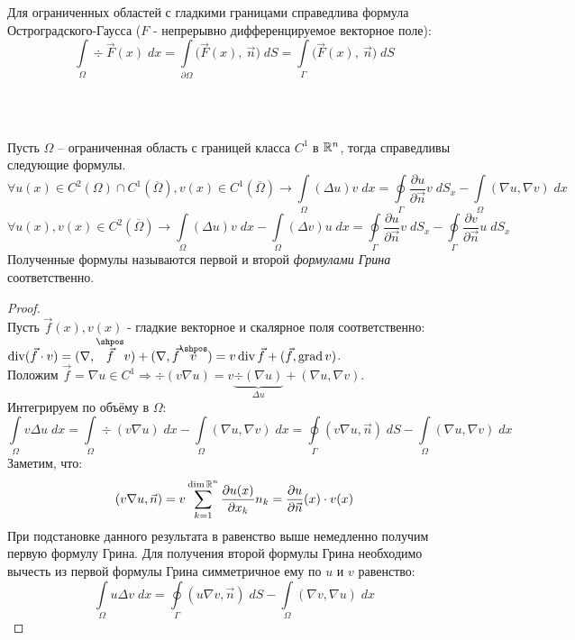 \documentclass[../main.tex]{subfiles}
\begin{document}
\begin{minipage}{0.8\textwidth}
Для ограниченных областей с гладкими границами справедлива формула Остроградского-Гаусса ($F$ - непрерывно дифференцируемое векторное поле):
$$\int\limits_{\Omega} \div \vec{F}(x)\;dx = \int\limits_{\partial \Omega} \bigl(\vec{F}(x),\: \vec{n}\bigr)\;dS = \int\limits_{\Gamma} \bigl(\vec{F}(x),\: \vec{n}\bigr)\;dS$$
\end{minipage} \\
\begin{lemma} \ \\
Пусть $\Omega$ -- ограниченная область с границей класса $C^1$ в $\mathbb{R}^n$, тогда справедливы следующие формулы.
	$$\forall u(x) \in C^2(\Omega)\cap C^1(\overline{\Omega}), v(x) \in C^1(\overline{\Omega}) \to \int\limits_{\Omega} (\Delta u)v\; dx = \oint\limits_{\Gamma} \dfrac{\partial u}{\partial \vec{n}} v\;dS_x - \int\limits_{\Omega}(\nabla u, \nabla v)\;dx $$
$$ \forall u(x), v(x) \in C^2(\overline{\Omega}) \to \int\limits_{\Omega} (\Delta u)v\; dx - \int\limits_{\Omega} (\Delta v)u\; dx = \oint\limits_{\Gamma} \dfrac{\partial u}{\partial \vec{n}} v\;dS_x - \oint\limits_{\Gamma} \dfrac{\partial v}{\partial \vec{n}} u\;dS_x$$
Полученные формулы называются первой и второй\; \textit{формулами Грина} соответственно.
\end{lemma}
\begin{proof}\ \\
Пусть $\vec{f}(x), v(x)$ - гладкие векторное и скалярное поля соответственно: $\div(\vec{f} \cdot v) = (\nabla, \overset{\shpos}{\vec{f}}v) + (\nabla, \vec{f}\overset{\shpos}{v}) = v\div \vec{f} + (\vec{f}, \grad{v})$. \\
Положим $\vec{f} = \nabla u \in C^1 \Rightarrow \div (v \nabla u) = v \underbrace{\div(\nabla u)}_{\Delta u} + (\nabla u, \nabla v)$. \\
Интегрируем по объёму в $\Omega$:
\begin{equation*}
	\int\limits_{\Omega} v \Delta u\;dx = 	\int\limits_{\Omega} \div(v\nabla u)\;dx -\int\limits_{\Omega} (\nabla u, \nabla v)\;dx = \oint\limits_{\Gamma}(v \nabla u, \vec{n})\;dS - \int\limits_{\Omega}(\nabla u, \nabla v)\;dx
\end{equation*}
Заметим, что:
$$(v\nabla u, \vec{n}) = v \sum\limits_{k = 1}^{\dim \mathbb{R}^n}\dfrac{\partial u(x)}{\partial x_k} n_k = \dfrac{\partial u}{\partial \vec{n}}(x) \cdot v(x)$$
При подстановке данного результата в равенство выше немедленно получим первую формулу Грина.
Для получения второй формулы Грина необходимо вычесть из первой формулы Грина симметричное ему по $u$ и $v$ равенство:
$$\int\limits_{\Omega} u \Delta v\;dx = \oint\limits_{\Gamma}(u \nabla v, \vec{n})\;dS - \int\limits_{\Omega}(\nabla v, \nabla u)\;dx$$
\end{proof}
\end{document}
